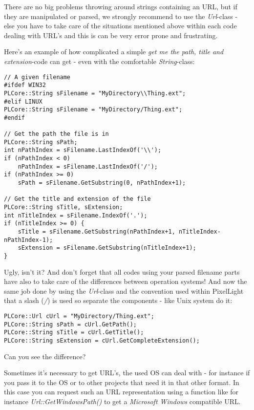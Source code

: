 There are no big problems throwing around strings containing an URL, but if they are manipulated or parsed, we strongly recommend to use the \emph{Url}-class - else you have to take care of the situations mentioned above within each code dealing with URL's and this is can be very error prone and frustrating.

Here's an example of how complicated a simple \emph{get me the path, title and extension}-code can get - even with the comfortable \emph{String}-class:

\begin{lstlisting}[caption=File path\, title and extension without using the Url-class]
// A given filename
#ifdef WIN32
PLCore::String sFilename = "MyDirectory\\Thing.ext";
#elif LINUX
PLCore::String sFilename = "MyDirectory/Thing.ext";
#endif

// Get the path the file is in
PLCore::String sPath;
int nPathIndex = sFilename.LastIndexOf('\\');
if (nPathIndex < 0)
	nPathIndex = sFilename.LastIndexOf('/');
if (nPathIndex >= 0)
	sPath = sFilename.GetSubstring(0, nPathIndex+1);

// Get the title and extension of the file
PLCore::String sTitle, sExtension;
int nTitleIndex = sFilename.IndexOf('.');
if (nTitleIndex >= 0) {
	sTitle = sFilename.GetSubstring(nPathIndex+1, nTitleIndex-nPathIndex-1);
	sExtension = sFilename.GetSubstring(nTitleIndex+1);
}
\end{lstlisting}

Ugly, isn't it? And don't forget that all codes using your parsed filename parts have also to take care of the differences between operation systems! And now the same job done by using the \emph{Url}-class and the convention used within PixelLight that a slash (\emph{/}) is used so separate the components - like Unix system do it:

\begin{lstlisting}[caption=File path\, title and extension using the Url class]
PLCore::Url cUrl = "MyDirectory/Thing.ext";
PLCore::String sPath = cUrl.GetPath();
PLCore::String sTitle = cUrl.GetTitle();
PLCore::String sExtension = cUrl.GetCompleteExtension();
\end{lstlisting}

Can you see the difference?

Sometimes it's necessary to get URL's, the used OS can deal with - for instance if you pass it to the OS or to other projects that need it in that other format. In this case you can request such an URL representation using a function like for instance \emph{Url::GetWindowsPath()} to get a \emph{Microsoft Windows} compatible URL.

